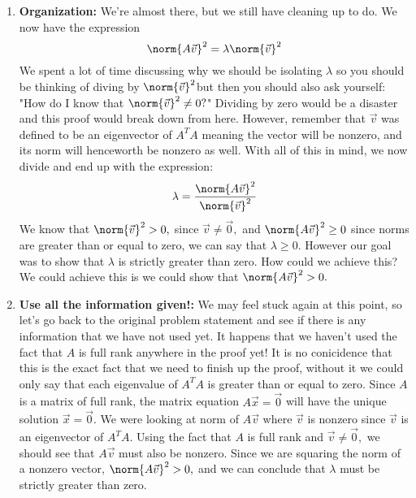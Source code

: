 \begin{enumerate}
 \item \textbf{Organization:} We're almost there, but we still have cleaning up to do. We now have the expression
 $$\norm{A \vec{v}}^{2} = \lambda \norm{\vec{v}}^{2}$$
 We spent a lot of time discussing why we should be isolating $\lambda$ so you should be thinking of diving by $\norm{\vec{v}}^{2}$but then you should also ask yourself: "How do I know that $\norm{\vec{v}}^{2} \neq 0?$" 
 Dividing by zero would be a disaster and this proof would break down from here.
 However, remember that $\vec{v}$ was defined to be an eigenvector of $A^{T}A$ meaning the vector will be nonzero, and its norm will henceworth be nonzero as well.
 With all of this in mind, we now divide and end up with the expression:
 $$\lambda = \frac{\norm{A\vec{v}}^{2}}{\norm{\vec{v}}^{2}}$$
 We know that $\norm{\vec{v}}^{2} > 0,$ since $\vec{v} \neq \vec{0},$ and $\norm{A\vec{v}}^{2} \geq 0$ since norms are greater than or equal to zero, we can say that $\lambda \geq 0.$ However our goal was to show that $\lambda$ is strictly greater than zero. How could we achieve this? We could achieve this is we could show that $\norm{A\vec{v}}^{2} > 0.$ 
\item \textbf{Use all the information given!:}
 We may feel stuck again at this point, so let's go back to the original problem statement and see if there is any information that we have not used yet. It happens that we haven't used the fact that $A$ is full rank anywhere in the proof yet! 
 It is no conicidence that this is the exact fact that we need to finish up the proof, without it we could only say that each eigenvalue of $A^{T}A$ is greater than or equal to zero. Since $A$ is a matrix of full rank, the matrix equation $A \vec{x} =\vec{0}$ will have the unique solution $\vec{x} = \vec{0}.$ We were looking at norm of $A \vec{v}$ where $\vec{v}$ is nonzero since $\vec{v}$ is an eigenvector of $A^{T}A.$ Using the fact that $A$ is full rank and  $\vec{v} \neq \vec{0},$ we should see that $A \vec{v}$ must also be nonzero. Since we are squaring the norm of a nonzero vector, $\norm{A\vec{v}}^{2} > 0,$ and we can conclude that $\lambda$ must be strictly greater than zero.
\end{enumerate}



